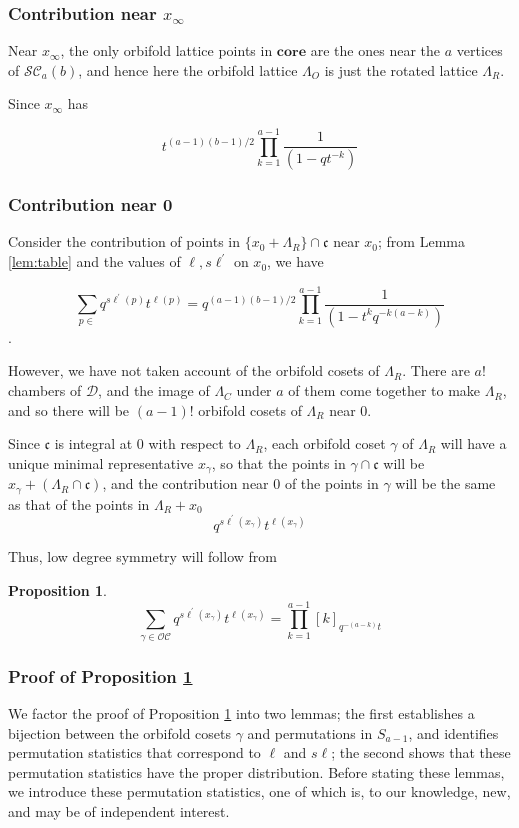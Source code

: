 \documentclass{amsart}[12pt]
\theoremstyle{definition}
\newtheorem{proposition}[dummy]{Proposition}
\newcommand{\core}{\mathbf{core}}
\newcommand{\SC}{\mathcal{SC}}
\newcommand{\OC}{\mathcal{OC}}
\newcommand{\sk}{s\ell}
\newcommand{\cone}{\mathfrak{c}}
\newcommand{\dominant}{\mathcal{D}}
\begin{document}
\subsubsection{Contribution near $x_\infty$}
Near $x_\infty$, the only orbifold lattice points in $\core$ are the ones near the $a$ vertices of $\SC_a(b)$, and hence here the orbifold lattice $\Lambda_O$ is just the rotated lattice $\Lambda_R$.  

Since $x_\infty$ has 

$$t^{(a-1)(b-1)/2}\prod_{k=1}^{a-1}\frac{1}{(1-qt^{-k})}$$


\subsubsection{Contribution near 0}
Consider the contribution of points in $\{x_0+\Lambda_R\}\cap\cone$ near $x_0$; from Lemma \ref{lem:table} and the values of $\ell, \sk^\prime$ on $x_0$, we have

$$\sum_{p\in } q^{\sk^\prime(p)}t^{\ell(p)}=q^{(a-1)(b-1)/2}\prod_{k=1}^{a-1} \frac{1}{(1-t^kq^{-k(a-k)})}$$.

However, we have not taken account of the orbifold cosets of $\Lambda_R$.  There are $a!$ chambers of $\dominant$, and the image of $\Lambda_C$ under $a$ of them come together to make $\Lambda_R$, and so there will be $(a-1)!$ orbifold cosets of $\Lambda_R$ near $0$.  

Since $\cone$ is integral at $0$ with respect to $\Lambda_R$, each orbifold coset $\gamma$ of $\Lambda_R$ will have a unique minimal representative $x_\gamma$, so that the points in $\gamma\cap\cone$ will be $x_\gamma+\left(\Lambda_R\cap \cone\right)$,  and the contribution near $0$ of the points in $\gamma$ will be the same as that of the points in $\Lambda_R+x_0$
$$q^{\sk^\prime(x_\gamma)}t^{\ell(x_\gamma)}$$

Thus, low degree symmetry will follow from
\begin{proposition} \label{prop:orbcosets}
$$\sum_{\gamma\in\OC} q^{\sk^\prime(x_\gamma)}t^{\ell(x_\gamma)}=\prod_{k=1}^{a-1}[k]_{q^{-(a-k)}t}$$ 

\end{proposition}
  
\subsubsection{Proof of Proposition \ref{prop:orbcosets}}

We factor the proof of Proposition \ref{prop:orbcosets} into two lemmas; the first establishes a bijection between the orbifold cosets $\gamma$ and permutations in $S_{a-1}$, and identifies permutation statistics that correspond to $\ell$ and $\sk$; the second shows that these permutation statistics have the proper distribution.  Before stating these lemmas, we introduce these permutation statistics, one of which is, to our knowledge, new, and may be of independent interest.
\end{document}
